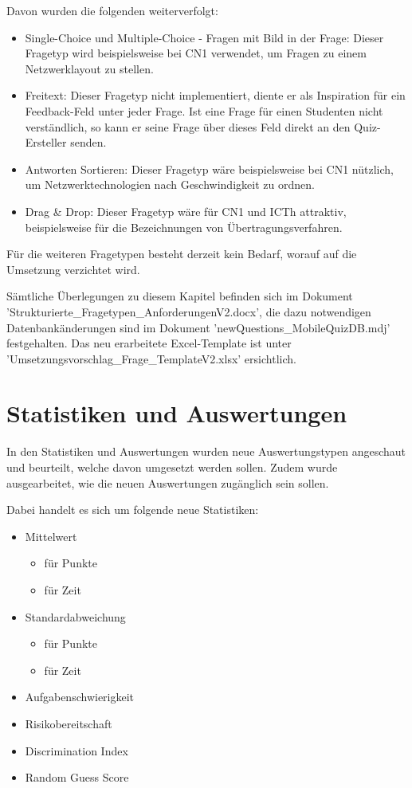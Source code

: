 Davon wurden die folgenden weiterverfolgt:
\begin{itemize}
	\item Single-Choice und Multiple-Choice - Fragen mit Bild in der Frage:
	Dieser Fragetyp wird beispielsweise bei \acrshort{CN1} verwendet, um Fragen zu einem Netzwerklayout zu stellen.
	\item Freitext:
	Dieser Fragetyp nicht implementiert, diente er als Inspiration für ein Feedback-Feld unter jeder Frage. Ist eine Frage für einen Studenten nicht verständlich, so kann er seine Frage über dieses Feld direkt an den Quiz-Ersteller senden.
	\item Antworten Sortieren:
	Dieser Fragetyp wäre beispielsweise bei \acrshort{CN1} nützlich, um Netzwerktechnologien nach Geschwindigkeit zu ordnen.
	\item Drag \& Drop:
	Dieser Fragetyp wäre für \acrshort{CN1} und \acrshort{ICTh} attraktiv, beispielsweise für die Bezeichnungen von Übertragungsverfahren.
\end{itemize}

\noindent Für die weiteren Fragetypen besteht derzeit kein Bedarf, worauf auf die Umsetzung verzichtet wird.

\bigskip

Sämtliche Überlegungen zu diesem Kapitel befinden sich im Dokument \\ 'Strukturierte\_Fragetypen\_AnforderungenV2.docx', die dazu notwendigen Datenbankänderungen sind im Dokument 'newQuestions\_MobileQuizDB.mdj' festgehalten.
Das neu erarbeitete Excel-Template ist unter 'Umsetzungsvorschlag\_Frage\_TemplateV2.xlsx' ersichtlich.

\section{Statistiken und Auswertungen}
In den Statistiken und Auswertungen wurden neue Auswertungstypen angeschaut und beurteilt, welche davon umgesetzt werden sollen. Zudem wurde ausgearbeitet, wie die neuen Auswertungen zugänglich sein sollen.

\bigskip

\noindent Dabei handelt es sich um folgende neue Statistiken:
\begin{itemize}
	\item Mittelwert
	\begin{itemize}
		\item für Punkte
		\item für Zeit
	\end{itemize}
	\item Standardabweichung
	\begin{itemize}
		\item für Punkte
		\item für Zeit
	\end{itemize}
	\item Aufgabenschwierigkeit
	\item Risikobereitschaft
	\item Discrimination Index
	\item Random Guess Score
\end{itemize}


